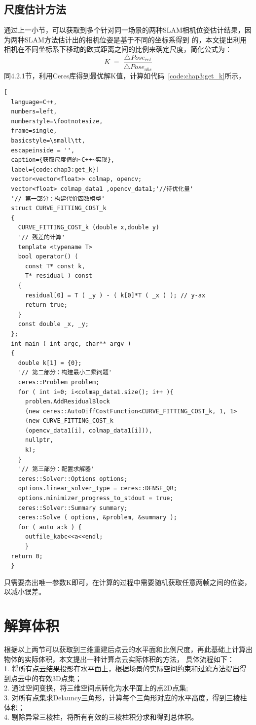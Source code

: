 \subsection{尺度估计方法}
通过上一小节，可以获取到多个针对同一场景的两种SLAM相机位姿估计结果，因为两种SLAM方法估计出的相机位姿是基于不同的坐标系得到
的，本文提出利用相机在不同坐标系下移动的欧式距离之间的比例来确定尺度，简化公式为：
\begin{equation}K\;=\;\frac{\triangle Pose_{rel}}{\triangle Pose_{abs}}  
\label{equ:getVolume_K}\end{equation}
同4.2.1节，利用Ceres库得到最优解K值，计算如代码~\ref{code:chap3:get_k}所示，
\begin{lstlisting}[
  language=C++,
  numbers=left,                
  numberstyle=\footnotesize,
  frame=single,     
  basicstyle=\small\tt,    
  escapeinside = '',
  caption={获取尺度值的~C++~实现},
  label={code:chap3:get_k}]
  vector<vector<float>> colmap, opencv;
  vector<float> colmap_data1 ,opencv_data1;'//待优化量'
  '// 第一部分：构建代价函数模型'
  struct CURVE_FITTING_COST_k
  {
    CURVE_FITTING_COST_k (double x,double y)
    '// 残差的计算'
    template <typename T>
    bool operator() (
      const T* const k,     
      T* residual ) const     
    {
      residual[0] = T ( _y ) - ( k[0]*T ( _x ) ); // y-ax
      return true;
    }
    const double _x, _y;
  };
  int main ( int argc, char** argv )
  {   
    double k[1] = {0};
    '// 第二部分：构建最小二乘问题'
    ceres::Problem problem;
    for ( int i=0; i<colmap_data1.size(); i++ ){
      problem.AddResidualBlock 
      (new ceres::AutoDiffCostFunction<CURVE_FITTING_COST_k, 1, 1>
      (new CURVE_FITTING_COST_k 
      (opencv_data1[i], colmap_data1[i])),
      nullptr,
      k);
    }
    '// 第三部分：配置求解器'
    ceres::Solver::Options options;   
    options.linear_solver_type = ceres::DENSE_QR;  
    options.minimizer_progress_to_stdout = true;  
    ceres::Solver::Summary summary;              
    ceres::Solve ( options, &problem, &summary );  
    for ( auto a:k ) {
      outfile_kabc<<a<<endl;
      }
  return 0;
  }
\end{lstlisting}
只需要杰出唯一参数K即可，在计算的过程中需要随机获取任意两帧之间的位姿，以减小误差。
\section{解算体积}
\label{sec:4.4}
根据以上两节可以获取到三维重建后点云的水平面和比例尺度，再此基础上计算出物体的实际体积，本文提出一种计算点云实际体积的方法，
具体流程如下：\\
1.	将所有点云结果投影在水平面上，根据场景的实际空间约束和过滤方法提出得到点云中的有效3D点集；\\
2.	通过空间变换，将三维空间点转化为水平面上的点2D点集;\\
3.	对所有点集求Delauncy三角形，计算每个三角形对应的水平高度，得到三棱柱体积；\\
4.	剔除异常三棱柱，将所有有效的三棱柱积分求和得到总体积。
